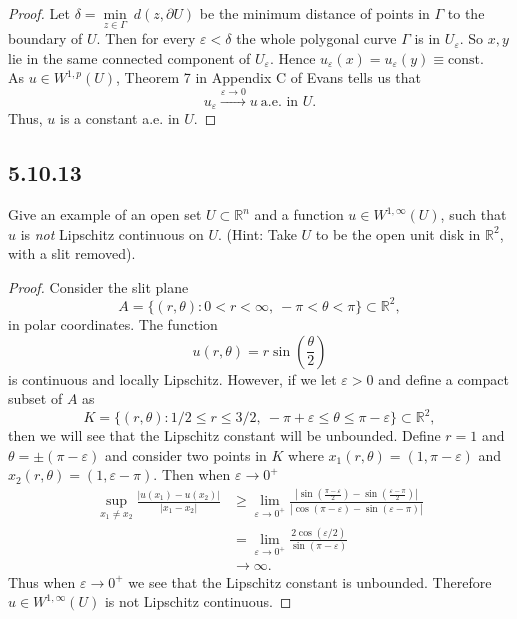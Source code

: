 \documentclass{article}
\begin{document}
\begin{flushleft}
\begin{proof}
Let $\delta=\underset{z\in\Gamma}{\min} ~d(z,\partial U)$ be the minimum distance of points in $\Gamma$ to the boundary of $U$. Then for every $\varepsilon < \delta$ the whole polygonal  curve $\Gamma$  is  in  $U_{\varepsilon}$. So $x,y$ lie  in  the  same connected  component  of  $U_{\varepsilon}$. Hence $u_{\varepsilon}(x)=u_{\varepsilon}(y)\equiv \text{const}.$
\\
\bigskip
As $u\in W^{1,p}(U)$, Theorem 7 in Appendix C of Evans tells us that
$$u_{\varepsilon}\overset{\varepsilon \to0}{\longrightarrow } u ~\text{a.e. in $U$}.$$
Thus, $u$ is a constant a.e. in $U$.
\end{proof}
\subsection{\textbf{5.10.13}} Give an example of an open set $U\subset \mathbb R^n$ and a function $u\in W^{1,\infty}(U)$, such that $u$ is \textit{not} Lipschitz continuous on $U$. (Hint: Take $U$ to be the open unit disk in $\mathbb R^2$, with a slit removed).

\begin{proof}
Consider the slit plane
$$A=\{(r,\theta):0< r < \infty,~ -\pi < \theta < \pi\}\subset\mathbb R^2,$$
in polar coordinates. The function 
$$u(r,\theta)=r\sin\left(\frac{\theta}{2}\right)$$
is continuous and locally Lipschitz. However, if we let $\varepsilon > 0$ and define a compact subset of $A$ as
$$K=\{(r,\theta): 1/2 \le r \le 3/2,~ -\pi + \varepsilon \le \theta \le \pi - \varepsilon \}\subset\mathbb R^2,$$
then we will see that the Lipschitz constant will be unbounded. Define $r=1$ and $\theta =\pm (\pi - \varepsilon)$ and consider two points in $K$ where $x_1(r,\theta)=(1,\pi-\varepsilon)$ and $x_2(r,\theta)= (1, \varepsilon - \pi).$ Then when $\varepsilon \to 0^+$
\begin{align*}
    \sup_{x_1 \ne x_2} \frac{|u(x_1)-u(x_2)|}{|x_1 - x_2|} &\ge
    \lim_{\varepsilon \to 0^+}\frac{\left|\sin\left(\frac{\pi - \varepsilon}{2}\right)- \sin\left(\frac{\varepsilon - \pi}{2}\right)\right|}{\left|\cos(\pi - \varepsilon)-\sin(\varepsilon-\pi)\right|}\\&=
    \lim_{\varepsilon \to 0^+}\frac{2\cos\left(\varepsilon /2\right)}{\sin(\pi-\varepsilon)} \\& \to \infty.
\end{align*}
Thus when $\varepsilon \to 0^+$ we see that the Lipschitz constant is unbounded. Therefore $u\in W^{1,\infty}(U)$ is not Lipschitz continuous.


\end{proof}
\end{flushleft}
\end{document}
